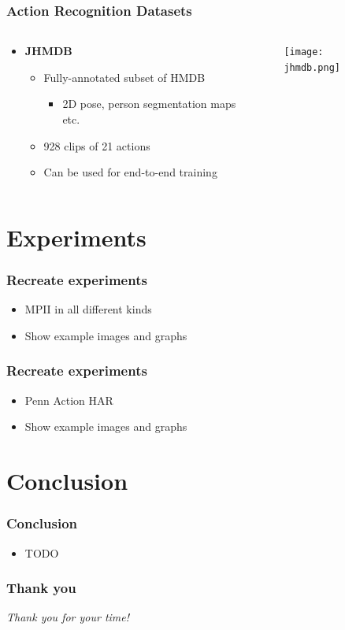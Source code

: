 \documentclass[9pt]{beamer}
\providecommand{\source}{\\ \footnotesize \tugreen{Source:} \footnotemark}
\newenvironment{myframe}[1][]{%
\begin{frame}%
\frametitle{#1}
\setcounter{footnote}{0}


}{%
\end{frame}%
}
\begin{document}
\begin{myframe}[Action Recognition Datasets]
  \begin{columns}[T]
      \begin{column}{.48\textwidth}
          \begin{itemize}
              \item \textbf{JHMDB\footnotemark}
              \begin{itemize}
                  \item Fully-annotated subset of HMDB
                  \begin{itemize}
                      \item 2D pose, person segmentation maps etc.
                  \end{itemize}
                  \item 928 clips of 21 actions
                  \item Can be used for end-to-end training
              \end{itemize}
          \end{itemize}
      \end{column}
      \begin{column}{.48\textwidth}
          \begin{figure}
              \texttt{[image: jhmdb.png]}
              \centering
              \source
          \end{figure}
      \end{column}
  \end{columns}
\end{myframe}

\section{Experiments}
\begin{myframe}[Recreate experiments]
    \begin{itemize}
        \item MPII in all different kinds
        \item Show example images and graphs
    \end{itemize}
\end{myframe}

\begin{myframe}[Recreate experiments]
    \begin{itemize}
        \item Penn Action HAR
        \item Show example images and graphs
    \end{itemize}
\end{myframe}

\section{Conclusion}
\begin{myframe}[Conclusion]
    \begin{itemize}
        \item TODO
    \end{itemize}
\end{myframe}

\begin{myframe}[Thank you]
    \centering \Large
    \emph{Thank you for your time!}
\end{myframe}
\end{document}
